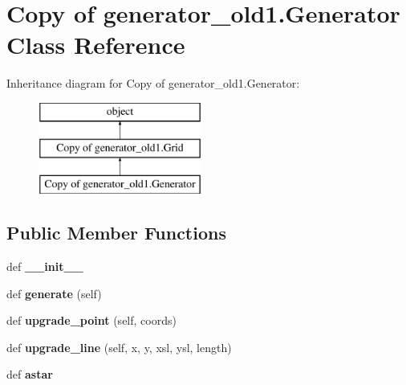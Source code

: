 \hypertarget{class_copy_01of_01generator__old1_1_1_generator}{}\section{Copy of generator\+\_\+old1.\+Generator Class Reference}
\label{class_copy_01of_01generator__old1_1_1_generator}
Inheritance diagram for Copy of generator\+\_\+old1.\+Generator\+:\begin{figure}[H]
\begin{center}
\leavevmode
\includegraphics[height=3.000000cm]{class_copy_01of_01generator__old1_1_1_generator}
\end{center}
\end{figure}
\subsection*{Public Member Functions}
\begin{DoxyCompactItemize}
\item 
\hypertarget{class_copy_01of_01generator__old1_1_1_generator_ae251c76380f62e1ca05c95f785d8c76d}{}def {\bfseries \+\_\+\+\_\+init\+\_\+\+\_\+}\label{class_copy_01of_01generator__old1_1_1_generator_ae251c76380f62e1ca05c95f785d8c76d}

\item 
\hypertarget{class_copy_01of_01generator__old1_1_1_generator_a4d06ee48224ad2cc70b819498c225bd3}{}def {\bfseries generate} (self)\label{class_copy_01of_01generator__old1_1_1_generator_a4d06ee48224ad2cc70b819498c225bd3}

\item 
\hypertarget{class_copy_01of_01generator__old1_1_1_generator_a714c4dbd96159cd385929d377d1bd749}{}def {\bfseries upgrade\+\_\+point} (self, coords)\label{class_copy_01of_01generator__old1_1_1_generator_a714c4dbd96159cd385929d377d1bd749}

\item 
\hypertarget{class_copy_01of_01generator__old1_1_1_generator_adc70313929f5807b72e9f83cbb0668ba}{}def {\bfseries upgrade\+\_\+line} (self, x, y, xsl, ysl, length)\label{class_copy_01of_01generator__old1_1_1_generator_adc70313929f5807b72e9f83cbb0668ba}

\item 
\hypertarget{class_copy_01of_01generator__old1_1_1_generator_af4e608f2b0d61f52ab49a1ee399d23c2}{}def {\bfseries astar}\label{class_copy_01of_01generator__old1_1_1_generator_af4e608f2b0d61f52ab49a1ee399d23c2}

\end{DoxyCompactItemize}
